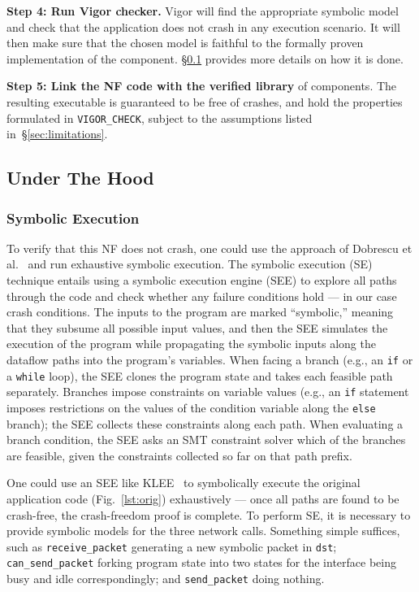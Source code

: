 \documentclass[letterpaper,twocolumn,10pt]{article}
\newcommand{\code}[1]{\lstinline{#1}}
\begin{document}
{\bf Step 4: Run Vigor checker.} Vigor will find the appropriate symbolic model
and check that the application does not crash in any execution scenario. It will
then make sure that the chosen model is faithful to the formally proven
implementation of the component. \S\ref{sec:under-the-hood} provides more
details on how it is done.

{\bf Step 5: Link the NF code with the verified library} of components. The
resulting executable is guaranteed to be free of crashes, and hold the
properties formulated in \code{VIGOR_CHECK}, subject to the assumptions listed
in~\S\ref{sec:limitations}.

\subsection{Under The Hood}
\label{sec:under-the-hood}

\subsubsection{Symbolic Execution}

To verify that this NF does not crash, one could use the approach of Dobrescu et
al.~\cite{dobrescu2014software} and run exhaustive symbolic execution. The
symbolic execution (SE) technique entails using a symbolic execution engine
(SEE) to explore all paths through the code and check whether any failure
conditions hold --- in our case crash conditions. The inputs to the program are
marked ``symbolic,'' meaning that they subsume all possible input values, and
then the SEE simulates the execution of the program while propagating the
symbolic inputs along the dataflow paths into the program's variables. When
facing a branch (e.g., an \code{if} or a \code{while} loop), the SEE clones the
program state and takes each feasible path separately. Branches impose
constraints on variable values (e.g., an \code{if} statement imposes
restrictions on the values of the condition variable along the \code{else}
branch); the SEE collects these constraints along each path. When evaluating a
branch condition, the SEE asks an SMT constraint solver which of the branches
are feasible, given the constraints collected so far on that path prefix.

One could use an SEE like KLEE~\cite{cadar2008klee} to symbolically execute the
original application code (Fig.~\ref{lst:orig}) exhaustively --- once all paths
are found to be crash-free, the crash-freedom proof is complete. To perform SE,
it is necessary to provide symbolic models for the three network calls.
Something simple suffices, such as \code{receive_packet} generating a new
symbolic packet in \code{dst}; \code{can_send_packet} forking program state into
two states for the interface being busy and idle correspondingly; and
\code{send_packet} doing nothing.
\end{document}
